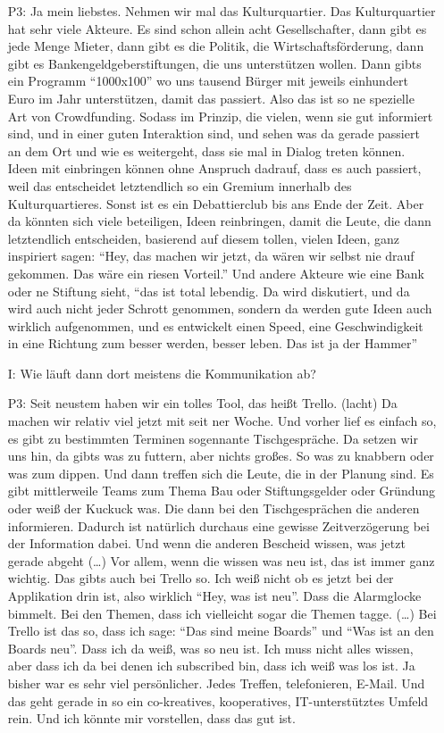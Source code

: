 \begin{itemize}
    \item[P3:] Ja mein liebstes. Nehmen wir mal das Kulturquartier. Das Kulturquartier hat sehr viele Akteure. Es sind schon allein acht Gesellschafter, dann gibt es jede Menge Mieter, dann gibt es die Politik, die Wirtschaftsf{\"o}rderung, dann gibt es Bankengeldgeberstiftungen, die uns unterst{\"u}tzen wollen. Dann gibts ein Programm "`1000x100"' wo uns tausend B{\"u}rger mit jeweils einhundert Euro im Jahr unterst{\"u}tzen, damit das passiert. Also das ist so ne spezielle Art von Crowdfunding. Sodass im Prinzip, die vielen, wenn sie gut informiert sind, und in einer guten Interaktion sind, und sehen was da gerade passiert an dem Ort und wie es weitergeht, dass sie mal in Dialog treten k{\"o}nnen. Ideen mit einbringen k{\"o}nnen ohne Anspruch dadrauf, dass es auch passiert, weil das entscheidet letztendlich so ein Gremium innerhalb des Kulturquartieres. Sonst ist es ein Debattierclub bis ans Ende der Zeit. Aber da k{\"o}nnten sich viele beteiligen, Ideen reinbringen, damit die Leute, die dann letztendlich entscheiden, basierend auf diesem tollen, vielen Ideen, ganz inspiriert sagen: "`Hey, das machen wir jetzt, da w{\"a}ren wir selbst nie drauf gekommen. Das w{\"a}re ein riesen Vorteil."' Und andere Akteure wie eine Bank oder ne Stiftung sieht, "`das ist total lebendig. Da wird diskutiert, und da wird auch nicht jeder Schrott genommen, sondern da werden gute Ideen auch wirklich aufgenommen, und es entwickelt einen Speed, eine Geschwindigkeit in eine Richtung zum besser werden, besser leben. Das ist ja der Hammer"'
    \item[I:] Wie l{\"a}uft dann dort meistens die Kommunikation ab?
    \item[P3:] Seit neustem haben wir ein tolles Tool, das hei{\ss}t Trello. (lacht) Da machen wir relativ viel jetzt mit seit ner Woche. Und vorher lief es einfach so, es gibt zu bestimmten Terminen sogennante Tischgespr{\"a}che. Da setzen wir uns hin, da gibts was zu futtern, aber nichts gro{\ss}es. So was zu knabbern oder was zum dippen. Und dann treffen sich die Leute, die in der Planung sind. Es gibt mittlerweile Teams zum Thema Bau oder Stiftungsgelder oder Gr{\"u}ndung oder wei{\ss} der Kuckuck was. Die dann bei den Tischgespr{\"a}chen die anderen informieren. Dadurch ist nat{\"u}rlich durchaus eine gewisse Zeitverz{\"o}gerung bei der Information dabei. Und wenn die anderen Bescheid wissen, was jetzt gerade abgeht (\dots) Vor allem, wenn die wissen was neu ist, das ist immer ganz wichtig. Das gibts auch bei Trello so. Ich wei{\ss} nicht ob es jetzt bei der Applikation drin ist, also wirklich "`Hey, was ist neu"'. Dass die Alarmglocke bimmelt. Bei den Themen, dass ich vielleicht sogar die Themen tagge. (\dots) Bei Trello ist das so, dass ich sage: "`Das sind meine Boards"' und "`Was ist an den Boards neu"'. Dass ich da wei{\ss}, was so neu ist. Ich muss nicht alles wissen, aber dass ich da bei denen ich subscribed bin, dass ich wei{\ss} was los ist. Ja bisher war es sehr viel pers{\"o}nlicher. Jedes Treffen, telefonieren, E-Mail. Und das geht gerade in so ein co-kreatives, kooperatives, IT-unterst{\"u}tztes Umfeld rein. Und ich k{\"o}nnte mir vorstellen, dass	das gut ist.

\end{itemize}
